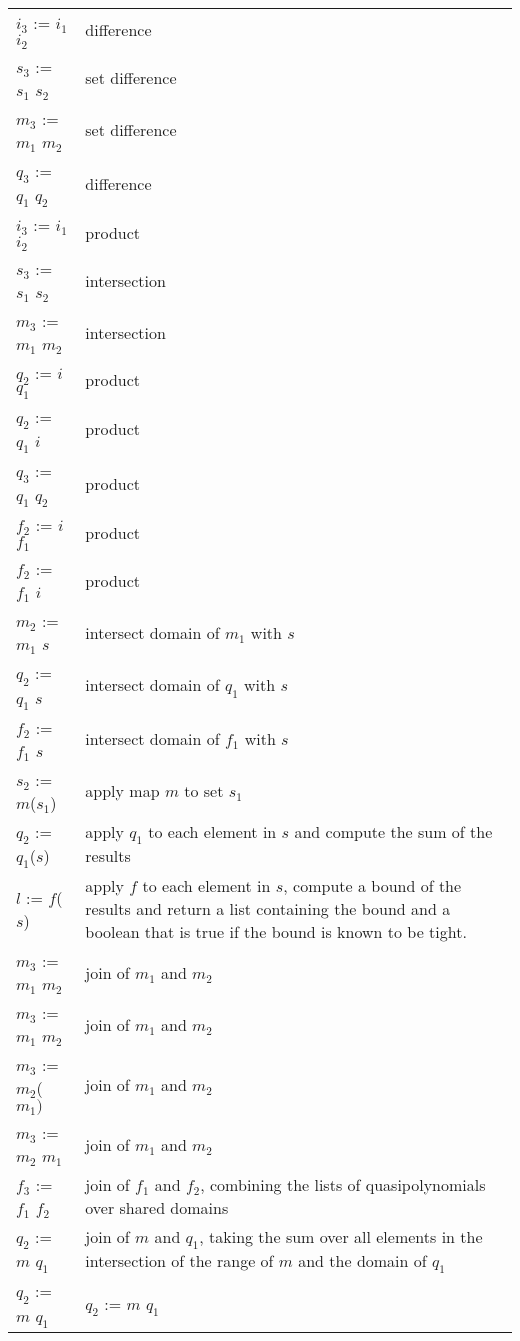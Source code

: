\begin{supertabular}{p{0.35\textwidth}p{0.6\textwidth}}
$i_3$ := $i_1$ \ai{$-$} $i_2$ & difference
\\
$s_3$ := $s_1$ \ai{$-$} $s_2$ & set difference
\\
$m_3$ := $m_1$ \ai{$-$} $m_2$ & set difference
\\
$q_3$ := $q_1$ \ai{$-$} $q_2$ & difference
\\
$i_3$ := $i_1$ \ai{$*$} $i_2$ & product
\\
$s_3$ := $s_1$ \ai{$*$} $s_2$ & intersection
\\
$m_3$ := $m_1$ \ai{$*$} $m_2$ & intersection
\\
$q_2$ := $i$ \ai{$*$} $q_1$ & product
\\
$q_2$ := $q_1$ \ai{$*$} $i$ & product
\\
$q_3$ := $q_1$ \ai{$*$} $q_2$ & product
\\
$f_2$ := $i$ \ai{$*$} $f_1$ & product
\\
$f_2$ := $f_1$ \ai{$*$} $i$ & product
\\
$m_2$ := $m_1$ \ai{$*$} $s$ & intersect domain of $m_1$ with $s$
\\
$q_2$ := $q_1$ \ai{$*$} $s$ & intersect domain of $q_1$ with $s$
\\
$f_2$ := $f_1$ \ai{$*$} $s$ & intersect domain of $f_1$ with $s$
\\
$s_2$ := $m$($s_1$) & apply map $m$ to set $s_1$
\\
$q_2$ := $q_1$($s$) & apply $q_1$ to each element in $s$ and compute
the sum of the results
\\
$l$ := $f$($s$) & apply $f$ to each element in $s$, compute
a bound of the results
and return a list containing the bound
and a boolean that is true if the bound
is known to be tight.
\\
$m_3$ := $m_1$  $m_2$ & join of $m_1$ and $m_2$
\\
$m_3$ := $m_1$  $m_2$ & join of $m_1$ and $m_2$
\\
$m_3$ := $m_2$($m_1)$ & join of $m_1$ and $m_2$
\\
$m_3$ := $m_2$  $m_1$ & join of $m_1$ and $m_2$
\\
$f_3$ := $f_1$  $f_2$ & join of $f_1$ and $f_2$, combining
the lists of quasipolynomials over shared domains
\\
$q_2$ := $m$  $q_1$ & join of $m$ and $q_1$, taking the sum
over all elements in the intersection of the range of $m$ and the domain
of $q_1$
\\
$q_2$ := $m$  $q_1$ & $q_2$ := $m$  $q_1$

\end{supertabular}
